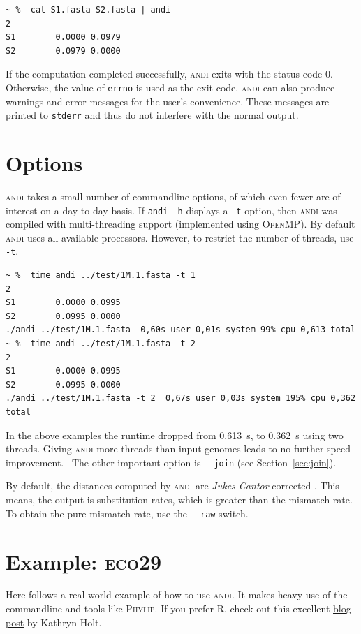 \documentclass[a4paper,
  10pt,
  english,
  DIV=12,
  BCOR=8mm]{scrbook}
\newcommand{\algo}[1]{\textsc{{#1}}}
\newcommand{\andi}{\algo{andi} }
\begin{document}
\begin{lstlisting}
~ %  cat S1.fasta S2.fasta | andi
2
S1        0.0000 0.0979
S2        0.0979 0.0000
\end{lstlisting}

If the computation completed successfully, \andi exits with the status code 0. Otherwise, the value of \lstinline$errno$ is used as the exit code. \andi can also produce warnings and error messages for the user's convenience. These messages are printed to \lstinline$stderr$ and thus do not interfere with the normal output.

\section{Options}

\andi takes a small number of commandline options, of which even fewer are of interest on a day-to-day basis. If \lstinline$andi -h$ displays a \lstinline$-t$ option, then \andi was compiled with multi-threading support (implemented using \algo{OpenMP}). By default \andi uses all available processors. However, to restrict the number of threads, use \lstinline$-t$.

\begin{lstlisting}
~ %  time andi ../test/1M.1.fasta -t 1
2
S1        0.0000 0.0995
S2        0.0995 0.0000
./andi ../test/1M.1.fasta  0,60s user 0,01s system 99% cpu 0,613 total
~ %  time andi ../test/1M.1.fasta -t 2
2
S1        0.0000 0.0995
S2        0.0995 0.0000
./andi ../test/1M.1.fasta -t 2  0,67s user 0,03s system 195% cpu 0,362 total
\end{lstlisting}

In the above examples the runtime dropped from \SI{0.613}{\second}, to \SI{0.362}{\second} using two threads. Giving \andi more threads than input genomes leads to no further speed improvement. \, The other important option is \lstinline$--join$ (see Section~\ref{sec:join}).

By default, the distances computed by \andi are \emph{Jukes-Cantor} corrected \cite{jukescantor}. This means, the output is substitution rates, which is greater than the mismatch rate. To obtain the pure mismatch rate, use the \lstinline$--raw$ switch.

\section{Example: \algo{eco29}}

Here follows a real-world example of how to use \algo{andi}. It makes heavy use of the commandline and tools like \algo{Phylip}. If you prefer \algo{R}, check out this excellent \href{http://holtlab.net/2015/05/08/r-code-to-infer-tree-from-andi-output/}{blog post} by Kathryn Holt.
\end{document}
